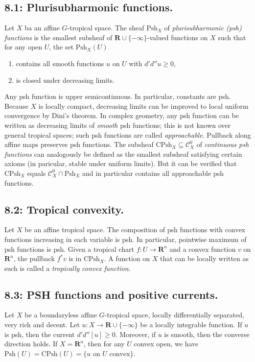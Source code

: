 \documentclass[12pt,reqno]{amsart}
\theoremstyle{definition}
\theoremstyle{remark}
\theoremstyle{citedrem}
\theoremstyle{cited}
\theoremstyle{citeddef}
\theoremstyle{step}
\begin{document}
\subsection*{8.1: Plurisubharmonic functions. }Let $X$ ba an affine $G$-tropical space. The sheaf $\mathrm{Psh}_X$ of \emph{plurisubharmonic (psh) functions} is the smallest subsheaf of $\mathbf{R}\cup \{-\infty\}$-valued functions on $X$ such that for any open $U$, the set $\mathrm{Psh}_X(U)$
\begin{enumerate}
    \item contains all smooth functions $u$ on $U$ with $d'd''u \geq 0$, 
    \item is closed under decreasing limits.
\end{enumerate}
Any psh function is upper semicontinuous. In particular, constants are psh. Because $X$ is locally compact, decreasing limits can be improved to local uniform convergence by Dini's theorem. In complex geometry, any psh function can be written as decreasing limits of \emph{smooth} psh functions; this is not known over general tropical spaces; such psh functions are called \emph{approachable}. Pullback along affine maps preserves psh functions. The subsheaf $\mathrm{CPsh}_X \subseteq \mathcal{C}^0_X$ of \emph{continuous psh functions} can analogously be defined as the smallest subsheaf satisfying certain axioms (in paricular, stable under uniform limits). But it can be verified that $\mathrm{CPsh}_X$ equals $\mathcal{C}^0_X \cap \mathrm{Psh}_X$ and in particular contains all approachable psh functions. 

\subsection*{8.2: Tropical convexity. }Let $X$ be an affine tropical space. The composition of psh functions with convex functions increasing in each variable is psh. In particular, pointwise maximum of psh functions is psh. Given a tropical chart $f \colon U \to \mathbf{R}^n$ and a convex function $v$ on $\mathbf{R}^n$, the pullback $f^* v$ is in $\mathrm{CPsh}_X$. A function on $X$ that can be locally written as such is called a \emph{tropically convex function}.

\subsection*{8.3: PSH functions and positive currents. }Let $X$ be a boundaryless affine $G$-tropical space, locally differentially separated, very rich and decent. Let $u \colon X \to \mathbf{R}\cup\{-\infty\}$ be a locally integrable function. If $u$ is psh, then the current $d'd''[u] \geq 0$. Moreover, if $u$ is smooth, then the converse direction holds. If $X = \mathbf{R}^n$, then for any $U$ convex open, we have $\mathrm{Psh}(U) = \mathrm{CPsh}(U) = \{u \text{ on } U \text{ convex}\}.$
\end{document}

